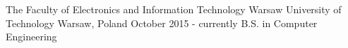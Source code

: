 

\begin{cventries}

  \cventry
    {The Faculty of Electronics and Information Technology} %
    {Warsaw University of Technology} %
    {Warsaw, Poland} %
    {October 2015 - currently} %
    {
      B.S. in Computer Engineering
    }

\end{cventries}
